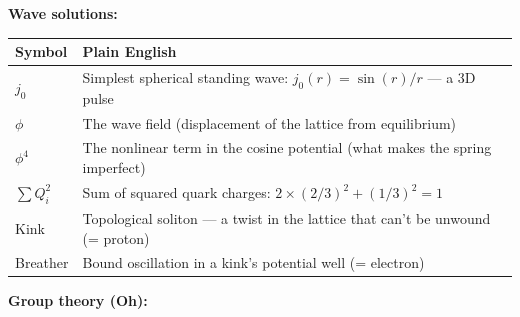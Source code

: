 \documentclass[
]{article}
\newcounter{none} %
\begin{document}
\textbf{Wave solutions:}

{\def\LTcaptype{none} %
\begin{longtable}[]{@{}
  >{\raggedright\arraybackslash}p{}
  >{\raggedright\arraybackslash}p{}@{}}
\toprule\noalign{}
\begin{minipage}[b]{\linewidth}\raggedright
Symbol
\end{minipage} & \begin{minipage}[b]{\linewidth}\raggedright
Plain English
\end{minipage} \\
\midrule\noalign{}
\endhead
\bottomrule\noalign{}
\endlastfoot
\(j_0\) & Simplest spherical standing wave: \(j_0(r) = \sin(r)/r\) --- a
3D pulse \\
\(\phi\) & The wave field (displacement of the lattice from
equilibrium) \\
\(\phi^4\) & The nonlinear term in the cosine potential (what makes the
spring imperfect) \\
\(\sum Q_i^2\) & Sum of squared quark charges:
\(2 \times (2/3)^2 + (1/3)^2 = 1\) \\
Kink & Topological soliton --- a twist in the lattice that can't be
unwound (= proton) \\
Breather & Bound oscillation in a kink's potential well (= electron) \\
\end{longtable}
}

\textbf{Group theory (Oh):}
\end{document}
